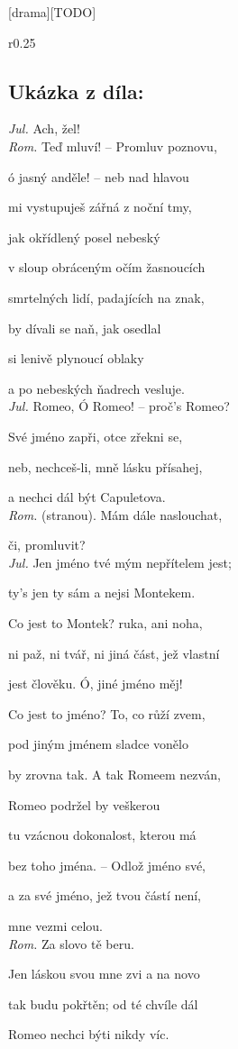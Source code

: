 \documentclass{extarticle} %
\begin{document}
\newpage


\changefontsize{8pt}

[drama][TODO]

\noindent\begin{wrapfigure}{r}{0.25\textwidth}
\tiny

\subsection*{Ukázka z díla:}
\setlength{\parindent}{3pt}
\noindent \textit{Jul.} Ach, žel! \\
\textit{Rom.} Teď mluví! -- Promluv poznovu, \par
ó jasný anděle! -- neb nad hlavou \par
mi vystupuješ zářná z noční tmy, \par
jak okřídlený posel nebeský \par
v sloup obráceným očím žasnoucích \par
smrtelných lidí, padajících na znak, \par
by dívali se naň, jak osedlal \par
si lenivě plynoucí oblaky \par
a po nebeských ňadrech vesluje. \\
\textit{Jul.} Romeo, Ó Romeo! -- proč's Romeo? \par
Své jméno zapři, otce zřekni se, \par
neb, nechceš-li, mně lásku přísahej, \par
a nechci dál být Capuletova. \\
\textit{Rom.} (stranou). Mám dále naslouchat, \par 
či, promluvit? \\
\textit{Jul.} Jen jméno tvé mým nepřítelem jest; \par
ty's jen ty sám a nejsi Montekem. \par
Co jest to Montek? ruka, ani noha, \par
ni paž, ni tvář, ni jiná část, jež vlastní \par
jest člověku. Ó, jiné jméno měj! \par
Co jest to jméno? To, co růží zvem, \par
pod jiným jménem sladce vonělo \par
by zrovna tak. A tak Romeem nezván, \par
Romeo podržel by veškerou \par
tu vzácnou dokonalost, kterou má \par
bez toho jména. -- Odlož jméno své, \par
a za své jméno, jež tvou částí není, \par
mne vezmi celou. \\
\textit{Rom.} Za slovo tě beru. \par
Jen láskou svou mne zvi a na novo \par
tak budu pokřtěn; od té chvíle dál \par
Romeo nechci býti nikdy víc. 
\end{wrapfigure}
\end{document}
